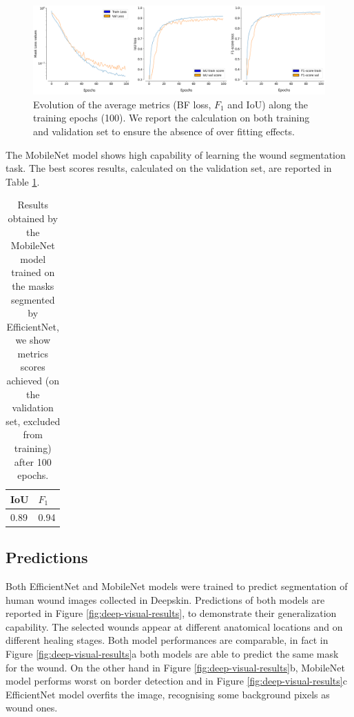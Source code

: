 \documentclass[../main.tex]{subfiles}
\begin{document}
\begin{figure}[H] 
\begin{center}
\includegraphics[width=16cm]{images/mob-train-deepskin.png}
\caption{\small{Evolution of the average metrics (BF loss, $F_1$ and IoU) along the training epochs (100).
We report the calculation on both training and validation set to ensure the absence of over fitting effects. }}\label{fig:mob-deepskin-train}
\end{center}
\end{figure}

The MobileNet model shows high capability of learning the wound segmentation task. 
The best scores results, calculated on the validation set, are reported in Table \ref{tab:results-mob-deepskin}.
\begin{table}[H]
    \centering
    
    \begin{tabular}{|l|l|}
    \hline
         IoU  & $F_1$  \\ \hline
         0.89 & 0.94 \\ \hline
    \end{tabular}
    \caption{Results obtained by the MobileNet model trained on the masks segmented by EfficientNet, we show metrics scores achieved (on the validation set, excluded from training) after 100 epochs.
   }\label{tab:results-mob-deepskin}
\end{table}

\subsection{Predictions}
Both EfficientNet and MobileNet models were trained to predict segmentation of human wound images collected in Deepskin. 
Predictions of both models are reported in Figure \ref{fig:deep-visual-results}, to demonstrate their generalization capability. 
The selected wounds appear at different anatomical locations and on different healing stages.
Both model performances are comparable, in fact in Figure \ref{fig:deep-visual-results}a both models are able to predict the same mask for the wound. 
On the other hand in Figure \ref{fig:deep-visual-results}b, MobileNet model performs worst on border detection and in Figure \ref{fig:deep-visual-results}c EfficientNet model overfits the image, recognising some background pixels as wound ones.
\end{document}
